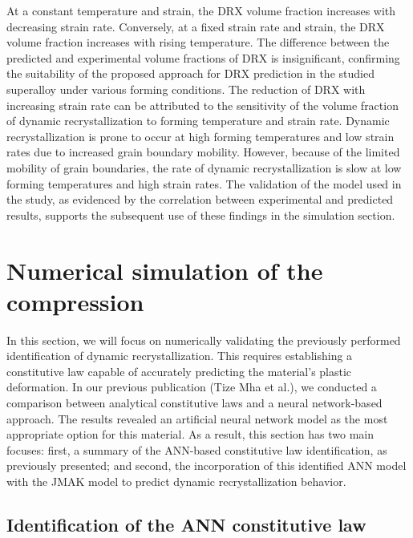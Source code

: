 \documentclass[metals,article,submit,pdftex,moreauthors]{Definitions/mdpi}
\makeatletter
\DeclareRobustCommand{\eal}{et al.\@\xspace}
\makeatother
\begin{document}
At a constant temperature and strain, the DRX volume fraction increases with decreasing strain rate.
Conversely, at a fixed strain rate and strain, the DRX volume fraction increases with rising temperature.
The difference between the predicted and experimental volume fractions of DRX is insignificant, confirming the suitability of the proposed approach for DRX prediction in the studied superalloy under various forming conditions.
The reduction of DRX with increasing strain rate can be attributed to the sensitivity of the volume fraction of dynamic recrystallization to forming temperature and strain rate.
Dynamic recrystallization is prone to occur at high forming temperatures and low strain rates due to increased grain boundary mobility.
However, because of the limited mobility of grain boundaries, the rate of dynamic recrystallization is slow at low forming temperatures and high strain rates.
The validation of the model used in the study, as evidenced by the correlation between experimental and predicted results, supports the subsequent use of these findings in the simulation section.

\section{Numerical simulation of the compression\label{sec:NumSim}}
In this section, we will focus on numerically validating the previously performed identification of dynamic recrystallization.
This requires establishing a constitutive law capable of accurately predicting the material's plastic deformation.
In our previous publication (Tize Mha \eal \cite{TizeMha-2023}), we conducted a comparison between analytical constitutive laws and a neural network-based approach.
The results revealed an artificial neural network model as the most appropriate option for this material.
As a result, this section has two main focuses: first, a summary of the ANN-based constitutive law identification, as previously presented; and second, the incorporation of this identified ANN model with the JMAK model to predict dynamic recrystallization behavior.

\subsection{Identification of the ANN constitutive law\label{subsec:ANNConstitutiveLaw}}
\end{document}
